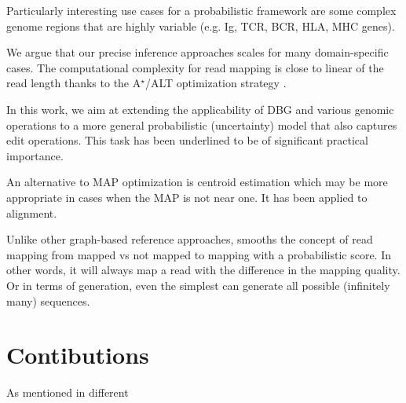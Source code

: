 Particularly interesting use cases for a probabilistic framework are some complex genome regions that are highly variable (e.g. Ig, TCR, BCR, HLA, MHC genes).

We argue that our precise inference approaches scales for many domain-specific cases. The computational complexity for read mapping is close to linear of the read length thanks to the A$^\star$/ALT optimization strategy \cite{goldberg2005computing}.

In this work, we aim at extending the applicability of DBG and various genomic operations to a more general probabilistic (uncertainty) model that also captures edit operations. This task has been underlined to be of significant practical importance\cite{paten2017genome}.

An alternative to MAP optimization is centroid estimation\cite{carvalho2008centroid} which may be more appropriate in cases when the MAP is not near one. It has been applied to alignment\cite{hamada2011probabilistic}.

Unlike other graph-based reference approaches, \tool smooths the concept of read mapping from mapped vs not mapped to mapping with a probabilistic score.
In other words, it will always map a read with the difference in the mapping quality.
Or in terms of generation, even the simplest \tool can generate all possible (infinitely many) sequences.


\section{Contibutions}
As mentioned in different 

